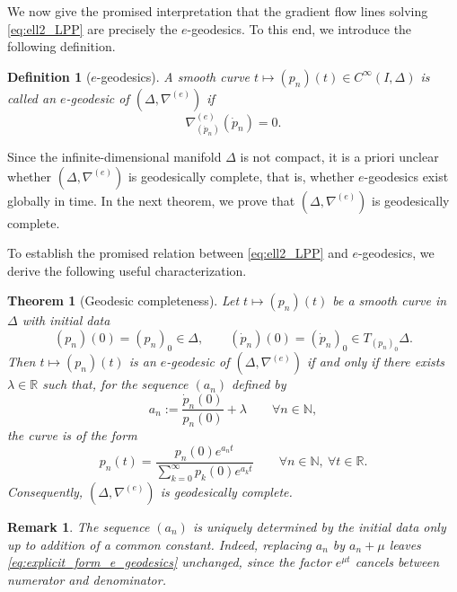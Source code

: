 \documentclass[12pt]{amsart}
\newtheorem{theorem}{Theorem}[section]
\newtheorem{definition}[definition]{Definition}
\newtheorem{remark}[remark]{Remark}
\numberwithin{figure}{section}
\numberwithin{table}{section}
\numberwithin{equation}{section}
\begin{document}
We now give the promised interpretation that the gradient flow lines solving \eqref{eq:ell2_LPP} are precisely the \(e\)-geodesics. To this end, we introduce the following definition.

\begin{definition}[\(e\)-geodesics]\label{def:e-geodesic}
A smooth curve \(t\mapsto (p_n)(t)\in C^{\infty}(I,\Delta)\) is called an \emph{\(e\)-geodesic} of \((\Delta,\nabla^{(e)})\) if
\[
\nabla^{(e)}_{(\dot p_n)}(\dot p_n)=0.
\]
\end{definition}

Since the infinite-dimensional manifold \(\Delta\) is not compact, it is a priori unclear whether \((\Delta,\nabla^{(e)})\) is geodesically complete, that is, whether \(e\)-geodesics exist globally in time. In the next theorem, we prove that \((\Delta,\nabla^{(e)})\) is geodesically complete.

To establish the promised relation between \eqref{eq:ell2_LPP} and \(e\)-geodesics, we derive the following useful characterization.

\begin{theorem}[Geodesic completeness]\label{prop:e_geodesics_equation}
Let \(t\mapsto (p_n)(t)\) be a smooth curve in \(\Delta\) with initial data
\[
(p_n)(0)=(p_n)_0\in \Delta,
\qquad
(\dot p_n)(0)=(\dot p_n)_0\in T_{(p_n)_0}\Delta.
\]
Then \(t\mapsto (p_n)(t)\) is an \(e\)-geodesic of \((\Delta,\nabla^{(e)})\) if and only if there exists \(\lambda\in\mathbb{R}\) such that, for the sequence \((a_n)\) defined by
\[
a_n:=\frac{\dot p_n(0)}{p_n(0)}+\lambda
\qquad \forall n\in\mathbb{N},
\]
the curve is of the form
\begin{equation}\label{eq:explicit_form_e_geodesics}
p_n(t)=\frac{p_n(0)e^{a_n t}}{\sum_{k=0}^{\infty} p_k(0)e^{a_k t}}
\qquad \forall n\in\mathbb{N},\ \forall t\in\mathbb{R}.
\end{equation}
Consequently, \((\Delta,\nabla^{(e)})\) is geodesically complete.
\end{theorem}

\begin{remark}
The sequence \((a_n)\) is uniquely determined by the initial data only up to addition of a common constant. Indeed, replacing \(a_n\) by \(a_n+\mu\) leaves \eqref{eq:explicit_form_e_geodesics} unchanged, since the factor \(e^{\mu t}\) cancels between numerator and denominator.
\end{remark}
\end{document}
